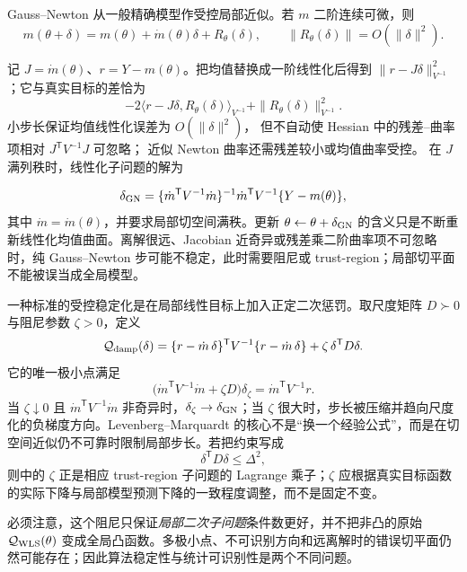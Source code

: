 \begin{definition}
Gauss--Newton 从一般精确模型作受控局部近似。若 $m$ 二阶连续可微，则
\[
 m(\theta+\delta)
 =m(\theta)+\dot m(\theta)\delta+R_\theta(\delta),
 \qquad
 \|R_\theta(\delta)\|=O(\|\delta\|^2).
\]

记 $J=\dot m(\theta)$、$r=Y-m(\theta)$。把均值替换成一阶线性化后得到
$\|r-J\delta\|_{V^{-1}}^2$；它与真实目标的差恰为
\[
 -2\langle r-J\delta,R_\theta(\delta)\rangle_{V^{-1}}
 +\|R_\theta(\delta)\|_{V^{-1}}^2.
\]
小步长保证均值线性化误差为 $O(\|\delta\|^2)$，
但不自动使 Hessian 中的残差--曲率项相对 $J^{\mathsf T}V^{-1}J$ 可忽略；
近似 Newton 曲率还需残差较小或均值曲率受控。
在 $J$ 满列秩时，线性化子问题的解为

\begin{equation*}\delta_{\rm GN}
 =\{\dot m^{\mathsf T}V^{-1}\dot m\}^{-1}
 \dot m^{\mathsf T}V^{-1}\{Y-m(\theta)\},
\end{equation*}
其中 $\dot m=\dot m(\theta)$，并要求局部切空间满秩。更新 $\theta\leftarrow\theta+\delta_{\rm GN}$ 的含义只是不断重新线性化均值曲面。离解很远、Jacobian 近奇异或残差乘二阶曲率项不可忽略时，纯 Gauss--Newton 步可能不稳定，此时需要阻尼或 trust-region；局部切平面不能被误当成全局模型。
\end{definition}

\begin{proposition}
一种标准的受控稳定化是在局部线性目标上加入正定二次惩罚。取尺度矩阵 $D\succ0$ 与阻尼参数 $\zeta>0$，定义
\[
 \mathcal Q_{\rm damp}(\delta)
 =\{r-\dot m\,\delta\}^{\mathsf T}V^{-1}\{r-\dot m\,\delta\}
 +\zeta\,\delta^{\mathsf T}D\delta.
\]
它的唯一极小点满足
\begin{equation}\label{eq:math-stat-levenberg-marquardt-step}
 \bigl(\dot m^{\mathsf T}V^{-1}\dot m+\zeta D\bigr)\delta_\zeta
 =\dot m^{\mathsf T}V^{-1}r.
\end{equation}
当 $\zeta\downarrow0$ 且 $\dot m^{\mathsf T}V^{-1}\dot m$ 非奇异时，$\delta_\zeta\to\delta_{\rm GN}$；当 $\zeta$ 很大时，步长被压缩并趋向尺度化的负梯度方向。Levenberg--Marquardt 的核心不是“换一个经验公式”，而是在切空间近似仍不可靠时限制局部步长。若把约束写成
\[
 \delta^{\mathsf T}D\delta\le\Delta^2,
\]
则中的 $\zeta$ 正是相应 trust-region 子问题的 Lagrange 乘子；$\zeta$ 应根据真实目标函数的实际下降与局部模型预测下降的一致程度调整，而不是固定不变。

必须注意，这个阻尼只保证\emph{局部二次子问题}条件数更好，并不把非凸的原始 $\mathcal Q_{\rm WLS}(\theta)$ 变成全局凸函数。多极小点、不可识别方向和远离解时的错误切平面仍然可能存在；因此算法稳定性与统计可识别性是两个不同问题。
\end{proposition}

